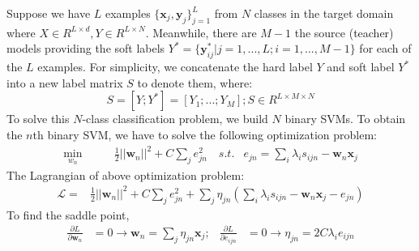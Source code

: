 Suppose we have $L$ examples $\{\textbf{x}_j,\textbf{y}_j\}_{j=1}^L$ from $N$ classes in the target domain where $X\in R^{L\times d}, Y\in R^{L\times N}$. Meanwhile, there are $M-1$ the source (teacher) models providing the soft labels $Y^*=\{\textbf{y}^*_{ij}|j=1,...,L;i=1,...,M-1\}$ for each of the $L$ examples.
For simplicity, we concatenate the hard label $Y$ and soft label $Y^*$ into a new label matrix $S$ to denote them, where:
\[S=[Y;Y^*]=[Y_1;...;Y_M]; S \in R^{L\times M \times N}\]
To solve this $N$-class classification problem, we build $N$ binary SVMs.
To obtain the $n$th binary SVM, we have to solve the following optimization problem: 
\begin{equation}\label{eq:multi-distill}
\begin{aligned}
\underset{w_n}{\min} \qquad & \frac{1}{2}{|| \textbf{w}_n ||^2} + C\sum_{j}{e_{jn}^2} \quad
s.t. & e_{jn} = \sum_i\lambda_is_{ijn} - \textbf{w}_n\textbf{x}_j%
\end{aligned}  
\end{equation}
The Lagrangian of above optimization problem:
\begin{equation}
\begin{aligned}
\mathcal{L}=&\frac{1}{2}{|| \textbf{w}_n ||^2} + C\sum_{j} {e_{jn}^2}+\sum_{j}\eta_{jn}\left(\sum_i\lambda_is_{ijn} - \textbf{w}_n\textbf{x}_j-e_{jn}\right)%
\end{aligned}
\end{equation}
To find the saddle point, 
\begin{equation}
\begin{aligned}
\frac{{\partial L}}{{\partial \textbf{w}_n}}& =0 \rightarrow \textbf{w}_n = \sum_{j}\eta_{jn} {\textbf{x}_j}; &
\frac{{\partial L}}{{\partial {e_{ijn}}}} & =0 \rightarrow \eta_{jn} = 2C\lambda_i {e_{ijn}}\\
\end{aligned}
\end{equation}
